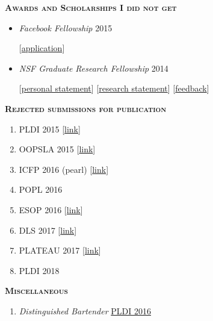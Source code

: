 \documentclass{article}
\newcommand{\mysection}[1]{\vspace{0.5cm}
\hspace{-1.3cm}\textsc{\textbf{#1}}~\hrulefill}
\begin{document}



\mysection{Awards and Scholarships I did not get}
\begin{itemize}
\item \emph{Facebook Fellowship} \hfill 2015
\item[] [\href{http://ccs.neu.edu/home/types/cv/failures/facebook-2015-reject.pdf}{application}]
\item \emph{NSF Graduate Research Fellowship} \hfill 2014
\item[] [\href{http://ccs.neu.edu/home/types/cv/failures/nsf-2014-personal-reject.pdf}{personal statement}]
        [\href{http://ccs.neu.edu/home/types/cv/failures/nsf-2014-research-reject.pdf}{research statement}]
        [\href{http://ccs.neu.edu/home/types/cv/failures/nsf-2014-reject-response.pdf}{feedback}]
\end{itemize}


\mysection{Rejected submissions for publication}

\begin{enumerate}
\item PLDI 2015 [\href{http://ccs.neu.edu/home/types/cv/failures/pldi-2015-reject.pdf}{link}]
\item OOPSLA 2015 [\href{http://ccs.neu.edu/home/types/cv/failures/oopsla-2015-reject.pdf}{link}]
\item ICFP 2016 (pearl) [\href{http://ccs.neu.edu/home/types/cv/failures/icfp-2016-reject.pdf}{link}]
\item POPL 2016
\item ESOP 2016 [\href{http://ccs.neu.edu/home/types/resources/type-tailoring.pdf}{link}]
\item DLS 2017 [\href{http://ccs.neu.edu/home/types/resources/dls-2017-reject.pdf}{link}]
\item PLATEAU 2017 [\href{http://ccs.neu.edu/home/types/cv/failures/plateau-2017-reject.pdf}{link}]
\item PLDI 2018 %
\end{enumerate}

\mysection{Miscellaneous}
\begin{enumerate}
\item \emph{Distinguished Bartender} \hfill \href{http://conf.researchr.org/home/PLDI-2016}{PLDI 2016}
\end{enumerate}
\end{document}
